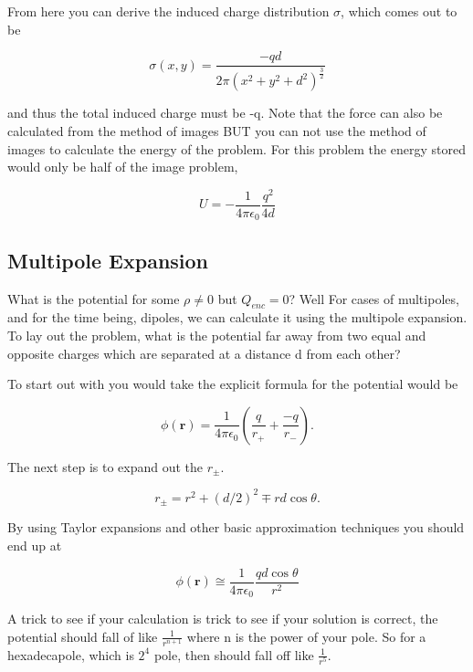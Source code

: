 \documentclass[preprint, review,12pt]{elsarticle}
\def\k{\frac{1}{4 \pi \epsilon_0}}
\def\b{\textbf}
\begin{document}
From here you can derive the induced charge distribution $\sigma$, which comes out to be

\begin{equation}
    \sigma(x,y) = \frac{-qd}{2\pi (x^2+y^2+d^2)^{\frac{3}{2}}}
\end{equation}

and thus the total induced charge must be -q. Note that the force can also be calculated from the method of images BUT you can not use the method of images to calculate the energy of the problem. For this problem the energy stored would only be half of the image problem,

\begin{equation}
    U = -\k\frac{q^2}{4d}
\end{equation}

\subsection{Multipole Expansion}

What is the potential for some $\rho \neq 0$ but $Q_{enc} = 0$? Well For cases of multipoles, and for the time being, dipoles, we can calculate it using the multipole expansion. To lay out the problem, what is the potential far away from two equal and opposite charges which are separated at a distance d from each other?

To start out with you would take the explicit formula for the potential would be 

\begin{equation}
    \phi(\b{r}) = \frac{1}{4\pi \epsilon_0}(\frac{q}{r_+}+\frac{-q}{r_-}).
\end{equation}

The next step is to expand out the $r_\pm$.

\begin{equation}
    r_\pm = r^2 + (d/2)^2 \mp rd\cos\theta.
\end{equation}

By using Taylor expansions and other basic approximation techniques you should end up at

\begin{equation}
    \phi(\b{r}) \cong \k \frac{qd\cos\theta}{r^2}
\end{equation}

A trick to see if your calculation is trick to see if your solution is correct, the potential should fall of like $\frac{1}{r^{n+1}}$ where n is the power of your pole. So for a hexadecapole, which is $2^4$ pole, then should fall off like $\frac{1}{r^5}$.
\end{document}
